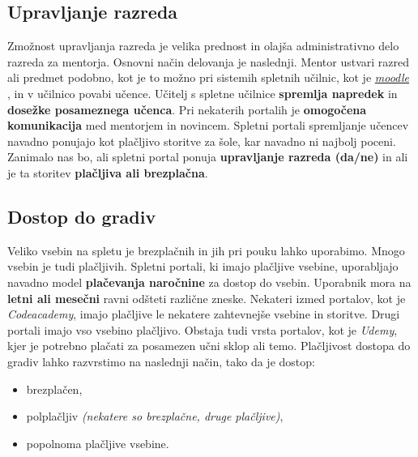 \subsection{Upravljanje razreda}
\label{sec:upravljanje_razreda}

Zmožnost upravljanja razreda je velika prednost in olajša administrativno delo
 razreda za mentorja. Osnovni način delovanja je
naslednji. Mentor ustvari razred ali predmet podobno, kot je to možno
pri sistemih spletnih učilnic, kot je
\emph{\href{https://moodle.org/}{moodle}} \cite{web:moodle_site}, in v
učilnico povabi učence. Učitelj s spletne učilnice \textbf{spremlja
  napredek} in \textbf{dosežke posameznega učenca}. Pri nekaterih
portalih je \textbf{omogočena komunikacija} med mentorjem in
novincem. Spletni portali spremljanje učencev navadno ponujajo kot
plačljivo storitve za šole, kar navadno ni najbolj poceni. Zanimalo
nas bo, ali spletni portal ponuja \textbf{upravljanje razreda (da/ne)}
in ali je ta storitev \textbf{plačljiva ali brezplačna}.

\subsection{Dostop do gradiv}
\label{sec:dostop_do_gradiv}

Veliko vsebin na spletu je brezplačnih in jih pri pouku lahko
uporabimo. Mnogo vsebin je tudi plačljivih. Spletni portali, ki imajo
plačljive vsebine, uporabljajo navadno model \textbf{plačevanja
  naročnine} za dostop do vsebin. Uporabnik mora na \textbf{letni ali
  mesečni} ravni odšteti različne zneske. Nekateri izmed portalov, kot
je \emph{Codeacademy}, imajo plačljive le nekatere zahtevnejše vsebine
in storitve. Drugi portali imajo vso vsebino
plačljivo. Obstaja tudi vrsta portalov, kot je \emph{Udemy}, kjer je
potrebno plačati za posamezen učni sklop ali temo.  Plačljivost
dostopa do gradiv lahko razvrstimo na naslednji način, tako da je
dostop:

\begin{itemize}
  \tightlist
\item brezplačen,
\item polplačljiv \emph{(nekatere so brezplačne, druge plačljive)},
\item popolnoma plačljive vsebine.
\end{itemize}


